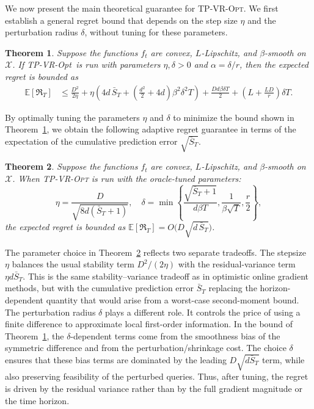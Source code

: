 \documentclass[journal,onecolumn]{IEEEtran}
\newcommand{\cX}{\mathcal{X}}
\theoremstyle{plain}
\newtheorem{theorem}{Theorem}[section]
\theoremstyle{definition}
\theoremstyle{remark}
\newcommand{\regret}{\mathfrak{R}}
\newcommand{\tpvr}{{\sc TP-VR-Opt}}
\begin{document}
We now present the main theoretical guarantee for \textsc{TP-VR-Opt}. We first establish
a general regret bound that depends on the step size $\eta$ and the perturbation
radius $\delta$, without tuning for these parameters.
\begin{theorem}
    \label{thm:exp-regret} Suppose the functions $f_{t}$ are convex, $L$-Lipschitz,
    and $\beta$-smooth on $\cX$. If \tpvr\, is run with parameters $\eta, \delta
    > 0$ and $\alpha = \delta/r$, then the expected regret is bounded as
    \begin{align*}
        \mathbb{E}[\regret_{T}]&\le\frac{D^{2}}{2\eta}+\eta\left( 4d\,\bar S_{T}+
        \left(\frac{d^{2}}{2}+4d\right)\beta^{2}\delta^{2}T \right)+\frac{Dd\beta\delta
        T}{2}+\left(L+\frac{LD}{r}\right)\delta T. \label{eq:main-exp-bound}
    \end{align*}
\end{theorem}

By optimally tuning the parameters $\eta$ and $\delta$ to minimize the bound shown in
Theorem~\ref{thm:exp-regret}, we obtain the following adaptive regret guarantee in terms of the expectation of the cumulative prediction error $\sqrt{\bar{S}_{T}}$.

\begin{theorem}
    \label{thm:two_point} Suppose the functions $f_{t}$ are convex, $L$-Lipschitz,
    and $\beta$-smooth on $\cX$. When \textsc{TP-VR-Opt} is run with the oracle-tuned
    parameters:
    \begin{equation*}
        \eta = \frac{D}{\sqrt{8d (\bar{S}_{T}+1)}}, \quad \delta = \min \left\{ \frac{\sqrt{\bar{S}_{T}+1}}{d\beta
        T}, \frac{1}{\beta\sqrt{T}}, \frac{r}{2}\right\},
    \end{equation*}
    the expected regret is bounded as $
        \mathbb{E}[\regret_{T}]=O\big( D \sqrt{d \, \bar S_{T}}\big)$.
\end{theorem}

The parameter choice in Theorem~\ref{thm:two_point} reflects two separate
tradeoffs. The stepsize $\eta$ balances the usual stability term
$D^2/(2\eta)$ with the residual-variance term $\eta d\bar S_T$. This is the
same stability--variance tradeoff as in optimistic online gradient methods, but
with the cumulative prediction error $\bar S_T$ replacing the horizon-dependent
quantity that would arise from a worst-case second-moment bound. The perturbation radius $\delta$ plays a different role. It controls the price
of using a finite difference to approximate local first-order information. In
the bound of Theorem~\ref{thm:exp-regret}, the $\delta$-dependent terms
come from the smoothness bias of the symmetric difference and from the
perturbation/shrinkage cost. The choice $\delta$ ensures that these bias terms are dominated by the leading
$D\sqrt{d\bar S_T}$ term, while also preserving feasibility of the perturbed
queries. Thus, after tuning, the regret is driven by the residual variance
rather than by the full gradient magnitude or the time horizon.
\end{document}
